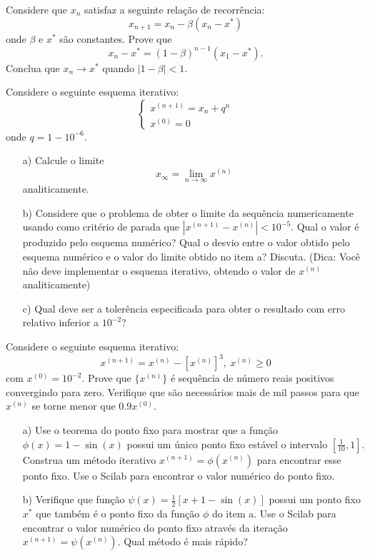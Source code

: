 \begin{Exercise}Considere que $x_n$ satisfaz a seguinte relação de recorrência:
$$x_{n+1}=x_n - \beta \left(x_n-x^*\right)$$
onde $\beta$ e $x^*$ são constantes.
Prove que $$x_n-x^*=(1-\beta)^{n-1}(x_1-x^*).$$
Conclua que $x_n\to x^*$ quando $|1-\beta|<1$.
\end{Exercise}

\begin{Exercise}[title=Convergência lenta] Considere o seguinte esquema iterativo:
$$
\left\{\begin{array}{l}
x^{(n+1)}=x_n+q^n\\
x^{(0)}=0
\end{array}
\right.$$
onde $q=1-10^{-6}$.
\begin{itemize}
\item[a)] Calcule o limite $$x_\infty=\lim_{n\to\infty}x^{(n)}$$ analiticamente.
\item[b)] Considere que o problema de obter o limite da sequência numericamente usando como critério de parada que $|x^{(n+1)}-x^{(n)}|<10^{-5}$. Qual o valor é produzido pelo esquema numérico? Qual o desvio entre o valor obtido pelo esquema numérico e o valor do limite obtido no item a?  Discuta. (Dica: Você não deve implementar o esquema iterativo, obtendo o valor de $x^{(n)}$ analiticamente)
\item[c)] Qual deve ser a tolerência especificada para obter o resultado com erro relativo inferior a $10^{-2}$?
\end{itemize}
\end{Exercise}

\begin{Exercise}[title=Convergência sublinear] Considere o seguinte esquema iterativo:
$$x^{(n+1)}=x^{(n)}-[x^{(n)}]^3,\ x^{(n)}\geq 0$$
com $x^{(0)}= 10^{-2}$.
Prove que $\{x^{(n)}\}$ é sequência de número reais positivos convergindo para zero. Verifique que são necessários mais de mil passos para que $x^{(n)}$ se torne menor que $0.9 x^{(0)}$.
\end{Exercise}


\begin{Exercise}[title=Taxa de convergência]
\begin{itemize}
\item[a)] Use o teorema do ponto fixo para mostrar que a função $\phi(x)=1-\sin(x)$ possui um único ponto fixo estável o intervalo $[\frac{1}{10},1]$. Construa um método iterativo $x^{(n+1)}=\phi(x^{(n)})$ para encontrar esse ponto fixo. Use o Scilab para encontrar o valor numérico do ponto fixo.
\item[b)] Verifique que função $\psi(x)=\frac{1}{2}\left[x+1-\sin(x)\right]$ possui um ponto fixo $x^*$ que também é o ponto fixo da função $\phi$ do item a. Use o Scilab para encontrar o valor numérico do ponto fixo através da iteração $x^{(n+1)}=\psi(x^{(n)})$. Qual método é mais rápido?
\end{itemize}
\end{Exercise}



